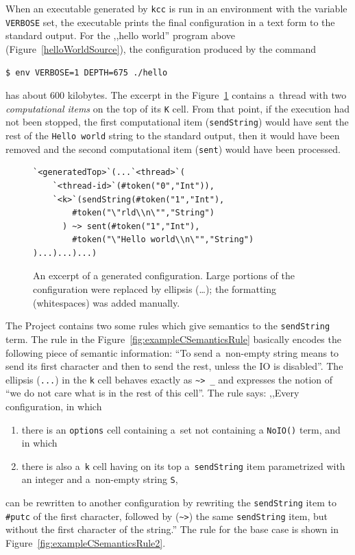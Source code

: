 \documentclass[nolot,nolof,nocover,printed]{fithesis3}
\newcommand{\kcc}{\texttt{kcc}\xspace}
\begin{document}
When an executable generated by \kcc is run in an environment with the variable \texttt{VERBOSE} set, the executable prints the final configuration in a text form to the standard output. For the ,,hello world'' program above (Figure~\ref{helloWorldSource}), the configuration produced by
the command
\begin{lstlisting}
$ env VERBOSE=1 DEPTH=675 ./hello
\end{lstlisting}
has about 600 kilobytes. The excerpt in the Figure~\ref{exampleConfigurationOutput} contains a~thread with two \textit{computational items} on the top of its \texttt{K} cell. From that point, if the execution had not been stopped, the first computational item (\texttt{sendString}) would have sent the rest of the \texttt{Hello world} string to the standard output, then it would have been removed and the second computational item (\texttt{sent}) would have been processed.

\begin{figure}[hp]
\begin{lstlisting}
`<generatedTop>`(...`<thread>`(
    `<thread-id>`(#token("0","Int")),
    `<k>`(sendString(#token("1","Int"),
        #token("\"rld\\n\"","String")
      ) ~> sent(#token("1","Int"),
        #token("\"Hello world\\n\"","String")
)...)...)...)
\end{lstlisting}
\caption{An excerpt of a generated configuration. Large portions of the configuration were replaced by ellipsis (\ldots); the formatting (whitespaces) was added manually.}
\label{exampleConfigurationOutput}
\end{figure}

The Project contains two some rules which give semantics to the \texttt{sendString} term.
The rule in the Figure~\ref{fig:exampleCSemanticsRule} basically encodes the following piece of semantic information: \enquote{To send a~non-empty string means to send its first character and then to send the rest, unless the IO is disabled}. The ellipsis (\lstinline|...|) in the \texttt{k} cell behaves exactly as \lstinline|~> _| and expresses the notion of \enquote{we do not care what is in the rest of this cell}. The rule says: ,,Every configuration, in which
\begin{enumerate}
\item there is an \texttt{options} cell containing a~set not containing a \texttt{NoIO()} term, and in which
\item there is also a~\texttt{k} cell having on its top a~\texttt{sendString} item parametrized with an integer and a~non-empty string \texttt{S},
\end{enumerate}
can be rewritten to another configuration by rewriting the \texttt{sendString} item to \texttt{\#putc} of the first character, followed by (\lstinline|~>|) the same \texttt{sendString} item, but without the first character of the string.'' The rule for the base case is shown in Figure~\ref{fig:exampleCSemanticsRule2}.
\end{document}
